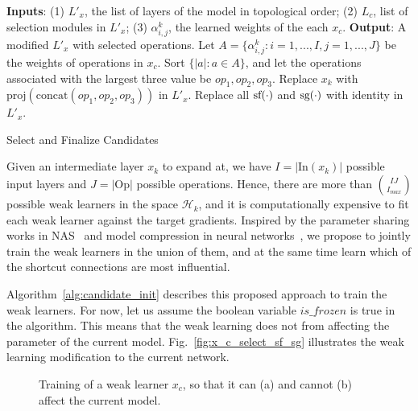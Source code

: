 \begin{algorithm}[t]
\begin{algorithmic}[1]
\STATE \textbf{Inputs}: (1) $L'_x$, the list of layers of the model in topological order;
(2) $L_c$, list of selection modules in $L'_x$;
(3) $\alpha^k_{i,j}$, the learned weights of the each $x_c$. 
\STATE \textbf{Output}: A modified $L'_x$ with selected operations.
    \STATE Let $A = \{\alpha^{k}_{i,j}: i = 1,..., I, j = 1,..., J\}$  be the weights of operations in $x_c$.
    \STATE Sort $\{ |a| : a \in A \}$, and let the operations associated with the largest three value be $op_1, op_2, op_3$.
    \STATE Replace $x_k$ with $\text{proj}(\text{concat}(op_1, op_2, op_3))$ in $L'_x$.
\ENDFOR
\STATE Replace all $\textrm{sf} (\cdot)$ and $\textrm{sg} (\cdot)$ with identity in $L'_x$.
\end{algorithmic}
\caption{Select and Finalize Candidates}
\label{alg:candidate_select}
\end{algorithm}


Given an intermediate layer $x_{k}$ to expand at, we have $I = |\text{In}(x_{k})|$ possible input layers and $J = |\text{Op}|$ possible operations.
Hence, there are more than $\binom{IJ}{I_{max}}$ possible weak learners
in the space $\mathcal{H}_{k}$, and it is computationally expensive to fit each weak learner against the target gradients. 
Inspired by the parameter sharing works in NAS~\citep{Pham2018EfficientNA,Liu2018DARTSDA} and model compression in neural networks~\citep{huang2017condensenet},
we propose to jointly train the weak learners in the union of them, 
and at the same time learn which of the shortcut connections are most influential. 


Algorithm~\ref{alg:candidate_init} describes this proposed approach to train the weak learners. 
For now, let us assume the boolean variable
$is\_frozen$ is true in the algorithm. This means that the weak learning does not from affecting the parameter of the current model. 
Fig.~\ref{fig:x_c_select_sf_sg} illustrates the weak learning modification to the current network. 

\begin{figure}[ht!]
\centering
{}
    
    \caption{Training of a weak learner $x_c$, so that it can (a) and cannot (b) affect the current model.}
\end{figure}


